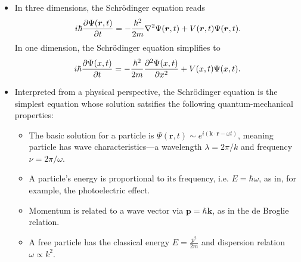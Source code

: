 \documentclass[11pt, a4paper]{article}
\renewcommand{\laplacian}{\nabla^{2}}
\newcommand{\Schro}{Schr\"{o}dinger\xspace}
\renewcommand{\vec}[1]{\bm{#1}}  %
\renewcommand{\r}{\vec{r}}  %
\renewcommand{\P}{\Psi}  %
\begin{document}
\begin{itemize}
    \item In three dimensions, the \Schro equation reads
    \begin{equation*}
        i \hbar \pdv{\Psi(\r, t)}{t} = - \frac{\hbar^{2}}{2m}\laplacian \P(\r, t) + V(\r, t)\Psi(\r, t).
    \end{equation*}
    In one dimension, the \Schro equation simplifies to
    \begin{equation*}
        i \hbar \pdv{\Psi(x, t)}{t} = - \frac{\hbar^{2}}{2m} \pdv[2]{\Psi(x, t)}{x} + V(x, t)\Psi(x,t).
    \end{equation*}
    
    
    
    \item Interpreted from a physical perspective, the \Schro equation is the simplest equation whose solution satsifies the following quantum-mechanical properties:
    \begin{itemize}
        \item The basic solution for a particle is $ \Psi(\r, t) \sim e^{i(\vec{k}\cdot \r - \omega t)} $, meaning particle has wave characteristics---a wavelength $ \lambda = 2\pi/k $ and frequency $ \nu = 2\pi/\omega $.
        
        \item A particle's energy is proportional to its frequency, i.e. $ E = \hbar \omega $, as in, for example, the photoelectric effect.
        
        \item Momentum is related to a wave vector via $ \vec{p} = \hbar \vec{k} $, as in the de Broglie relation.
        
        \item A free particle has the classical energy $ E = \frac{p^{2}}{2m} $ and dispersion relation $ \omega \propto k^{2} $.
    \end{itemize}


\end{itemize}
\end{document}
